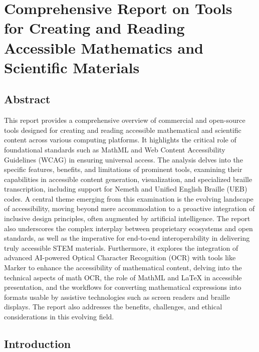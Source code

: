 \chapter{Comprehensive Report on Tools for Creating and Reading Accessible Mathematics and Scientific Materials}
\author{A PhD Researcher in AI and Accessibility Technologies}
\section{Abstract}
This report provides a comprehensive overview of commercial and open-source tools designed for creating and reading accessible mathematical and scientific content across various computing platforms. It highlights the critical role of foundational standards such as MathML and Web Content Accessibility Guidelines (WCAG) in ensuring universal access. The analysis delves into the specific features, benefits, and limitations of prominent tools, examining their capabilities in accessible content generation, visualization, and specialized braille transcription, including support for Nemeth and Unified English Braille (UEB) codes. A central theme emerging from this examination is the evolving landscape of accessibility, moving beyond mere accommodation to a proactive integration of inclusive design principles, often augmented by artificial intelligence. The report also underscores the complex interplay between proprietary ecosystems and open standards, as well as the imperative for end-to-end interoperability in delivering truly accessible STEM materials. Furthermore, it explores the integration of advanced AI-powered Optical Character Recognition (OCR) with tools like Marker to enhance the accessibility of mathematical content, delving into the technical aspects of math OCR, the role of MathML and LaTeX in accessible presentation, and the workflows for converting mathematical expressions into formats usable by assistive technologies such as screen readers and braille displays. The report also addresses the benefits, challenges, and ethical considerations in this evolving field.


\section{Introduction}
